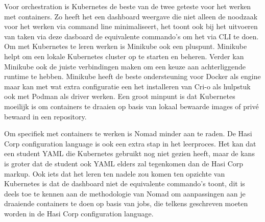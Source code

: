Voor orchestration is Kubernetes de beste van de twee geteste voor het werken met containers. Zo heeft het een dashboard weergave die niet alleen de noodzaak voor het werken via command line minimaliseert, het toont ook bij het uitvoeren van taken via deze dasboard de equivalente commando’s om het via CLI te doen. Om met Kubernetes te leren werken is Minikube ook een pluspunt. Minikube helpt om een lokale Kubernetes cluster op te starten en beheren. Verder kan Minikube ook de juiste verbindingen maken om een keuze aan achterliggende runtime te hebben.  Minikube heeft de beste ondersteuning voor Docker als engine maar kan met wat extra configuratie een het installeren van Cri-o als hulpstuk ook met Podman als driver werken. Een groot minpunt is dat Kubernetes moeilijk is om containers te draaien op basis van lokaal bewaarde images of privé bewaard in een repository.

Om specifiek met containers te werken is Nomad minder aan te raden. De Hasi Corp configuration language is ook een extra stap in het leerproces. Het kan dat een student YAML die Kubernetes gebruikt nog niet gezien heeft, maar de kans is groter dat de student ook YAML elders zal tegenkomen dan de Hasi Corp markup. Ook iets dat het leren ten nadele zou komen ten opzichte van Kubernetes is dat de dashboard niet de equivalente commando’s toont, dit is deels toe te kennen aan de methodologie van Nomad om aanpassingen aan je draaiende containers te doen op basis van jobs, die telkens geschreven moeten worden in de Hasi Corp configuration language.
